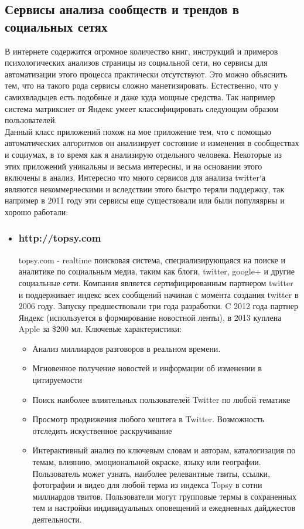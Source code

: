 \begin{chap1}
\subsection{Сервисы анализа сообществ и трендов в социальных сетях}
В интернете содержится огромное количество книг, инструкций и примеров психологических анализов страницы из социальной сети, но сервисы для автоматизации этого процесса практически отсутствуют. Это можно объяснить тем, что на такого рода сервисы сложно манетизировать. Естественно, что у самихвладьцев есть подобные и даже куда мощные средства. Так например система матрикснет от Яндекс умеет классифицировать следующим образом пользователей.\\ %

Данный класс приложений похож на мое приложение тем, что с помощью автоматических алгоритмов  он анализирует состояние и изменения в сообществах и социумах, в то время как я анализирую отдельного человека. Некоторые из этих приложений уникальны и весьма интересны, и на основании этого включены в анализ. Интересно что много сервисов для анализа twitter`а являются некоммерческими и вследствии этого быстро теряли поддержку, так например в 2011 году эти сервисы еще существовали или были популяярны и хорошо работали:
\begin{itemize}
\item \subsubsection{http://topsy.com}
topsy.com - realtime поисковая система, специализирующаяся на поиске и аналитике по социальным медиа, таким как блоги, twitter, google+ и другие социальные сети. Компания является сертифицированным партнером twitter и поддерживает индекс всех сообщений начиная с момента создания twitter в 2006 году. Запуску предшествовали три года разработки. C 2012 года партнер Яндекс (используется в формирование новостной ленты), в 2013 куплена Apple за  \$200 мл. Ключевые характеристики:
\begin{itemize}
\item Анализ миллиардов разговоров в реальном времени.
\item Мгновенное получение новостей и информации об изменении в цитируемости
\item Поиск наиболее влиятельных пользователей Twitter по любой тематике
\item Просмотр продвижения любого хештега в Twitter. Возможность отследить искуственное раскручивание
\item Интерактивный анализ по ключевым словам и авторам, каталогизация по темам, влиянию, эмоциональной окраске, языку или географии. Пользователь может узнать, наиболее релевантные твиты, ссылки, фотографии и видео для любой терма из индекса Topsy в сотни миллиардов твитов. Пользователи могут групповые термы в сохраненных тем и настройки индивидуальных оповещений и ежедневных дайджестов деятельности.

\end{itemize}
\end{itemize}
\end{chap1}
